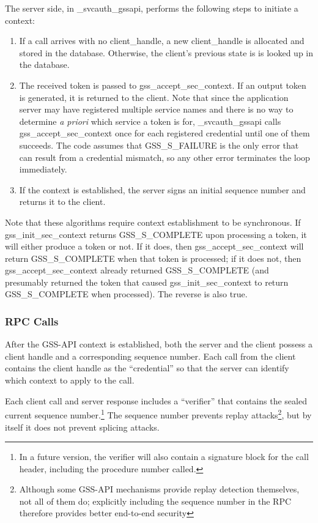 The server side, in _svcauth_gssapi, performs the following steps to
initiate a context:

\begin{enumerate}
\item If a call arrives with no client_handle, a new client_handle is
allocated and stored in the database.  Otherwise, the client's
previous state is is looked up in the database.

\item The received token is passed to gss_accept_sec_context.  If an
output token is generated, it is returned to the client.  Note that
since the application server may have registered multiple service
names and there is no way to determine {\it a priori} which service a
token is for, _svcauth_gssapi calls gss_accept_sec_context once for
each registered credential until one of them succeeds.  The code
assumes that GSS_S_FAILURE is the only error that can result from a
credential mismatch, so any other error terminates the loop
immediately.

\item If the context is established, the server signs an initial
sequence number and returns it to the client.
\end{enumerate}

Note that these algorithms require context establishment to be
synchronous.  If gss_init_sec_context returns GSS_S_COMPLETE upon
processing a token, it will either produce a token or not.  If it
does, then gss_accept_sec_context will return GSS_S_COMPLETE when that
token is processed; if it does not, then gss_accept_sec_context
already returned GSS_S_COMPLETE (and presumably returned the token
that caused gss_init_sec_context to return GSS_S_COMPLETE when
processed).  The reverse is also true.

\subsubsection{RPC Calls}

After the GSS-API context is established, both the server and the
client possess a client handle and a corresponding sequence number.
Each call from the client contains the client handle as the
``credential'' so that the server can identify which context to apply
to the call.

Each client call and server response includes a ``verifier'' that
contains the sealed current sequence number.\footnote{In a future
version, the verifier will also contain a signature block for the call
header, including the procedure number called.} The sequence number
prevents replay attacks\footnote{Although some GSS-API mechanisms
provide replay detection themselves, not all of them do; explicitly
including the sequence number in the RPC therefore provides better
end-to-end security}, but by itself it does not prevent splicing
attacks.

